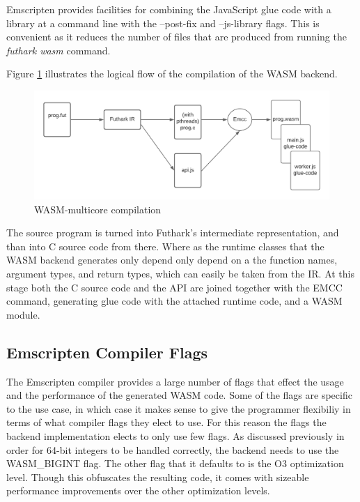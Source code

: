 \documentclass[11pt]{book}
\begin{document}
Emscripten provides facilities for combining the JavaScript glue code with a library at a command line with the --post-fix and --js-library flags. This is convenient as it reduces the number of files that are produced from running the \textit{futhark wasm} command.



Figure \ref{fig:wasm} illustrates the logical flow of the compilation of the WASM backend. 

\begin{figure}[htbp]
\centerline{\includegraphics[width=\textwidth]{figures/WASM_MC_compiler.png}}
\caption{WASM-multicore compilation}
\label{fig:wasm}
\end{figure}

The source program is turned into Futhark's intermediate representation, and than into C source code from there. Where as the runtime classes that the WASM backend generates only depend only depend on a the function names, argument types, and return types, which can easily be taken from the IR. At this stage both the C source code and the API are joined together with the EMCC command, generating glue code with the attached runtime code, and a WASM module. 

\subsection{Emscripten Compiler Flags}
The Emscripten compiler provides a large number of flags that effect the usage and the performance of the generated WASM code. Some of the flags are specific to the use case, in which case it makes sense to give the programmer flexibiliy in terms of what compiler flags they elect to use. For this reason the flags the backend implementation elects to only use few flags. As discussed previously in order for 64-bit integers to be handled correctly, the backend needs to use the WASM\_BIGINT flag. The other flag that it defaults to is the O3 optimization level. Though this obfuscates the resulting code, it comes with sizeable performance improvements over the other optimization levels.
\end{document}
